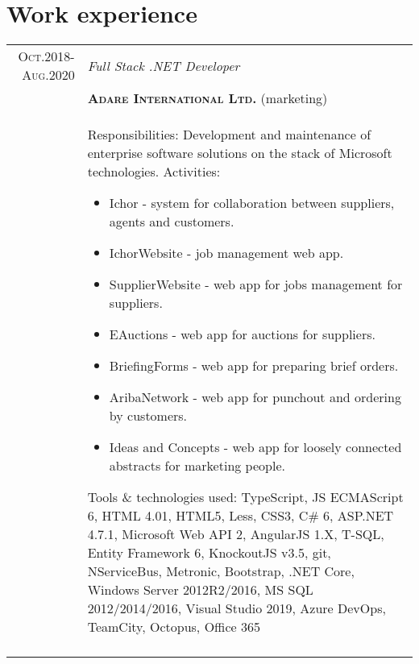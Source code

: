 \documentclass[a4paper,12pt]{article}
\begin{document}
\section{Work experience}
\begin{tabular}{r|p{12cm}}
\textsc{Oct.2018-Aug.2020}
	&\emph{Full Stack .NET Developer}\\
	&\textsc{\textbf{Adare International Ltd.}} (marketing)\\
	&\footnotesize{
		Responsibilities: Development and maintenance of enterprise software solutions on the stack of Microsoft technologies.\newline
		Activities:
		\begin{itemize}
			\item Ichor - system for collaboration between suppliers, agents and customers.
			\item IchorWebsite - job management web app.
			\item SupplierWebsite - web app for jobs management for suppliers.
			\item EAuctions - web app for auctions for suppliers.
			\item BriefingForms - web app for preparing brief orders.
			\item AribaNetwork - web app for punchout and ordering by customers.
			\item Ideas and Concepts - web app for loosely connected abstracts for marketing people.
		\end{itemize}
		Tools \& technologies used: \newline
		TypeScript, JS ECMAScript 6, HTML 4.01, HTML5, Less, CSS3, C# 6, ASP.NET 4.7.1, Microsoft Web API 2, 
		AngularJS 1.X, T-SQL, Entity Framework 6, KnockoutJS v3.5, git, NServiceBus, Metronic, Bootstrap, 
		.NET Core, Windows Server 2012R2/2016, MS SQL 2012/2014/2016,
		Visual Studio 2019, Azure DevOps, TeamCity, Octopus, Office 365
	}\\
	\multicolumn{2}{c}{}\\
\end{tabular}
\end{document}

